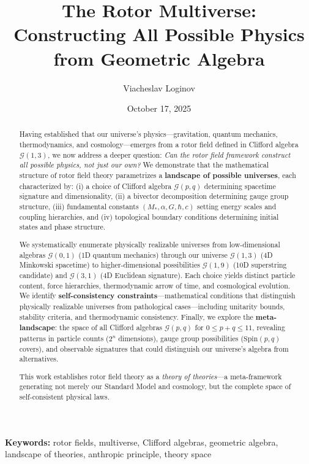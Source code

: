 \documentclass[11pt,a4paper]{article}
\title{\textbf{The Rotor Multiverse:\\
Constructing All Possible Physics\\
from Geometric Algebra}}
\author[1]{Viacheslav Loginov}
\affil[1]{Kyiv, Ukraine\\ \texttt{barthez.slavik@gmail.com}}
\date{\small October 17, 2025}
\numberwithin{equation}{section}
\theoremstyle{plain}
\theoremstyle{definition}
\theoremstyle{remark}
\newcommand{\Cl}{\mathcal{G}}               %
\begin{document}
\maketitle

\begin{abstract}
\noindent
Having established that our universe's physics—gravitation, quantum mechanics, thermodynamics, and cosmology—emerges from a rotor field defined in Clifford algebra $\Cl(1,3)$, we now address a deeper question: \emph{Can the rotor field framework construct all possible physics, not just our own?} We demonstrate that the mathematical structure of rotor field theory parametrizes a \textbf{landscape of possible universes}, each characterized by:
(i) a choice of Clifford algebra $\Cl(p,q)$ determining spacetime signature and dimensionality,
(ii) a bivector decomposition determining gauge group structure,
(iii) fundamental constants $(M_*, \alpha, G, \hbar, c)$ setting energy scales and coupling hierarchies, and
(iv) topological boundary conditions determining initial states and phase structure.

We systematically enumerate physically realizable universes from low-dimensional algebras $\Cl(0,1)$ (1D quantum mechanics) through our universe $\Cl(1,3)$ (4D Minkowski spacetime) to higher-dimensional possibilities $\Cl(1,9)$ (10D superstring candidate) and $\Cl(3,1)$ (4D Euclidean signature). Each choice yields distinct particle content, force hierarchies, thermodynamic arrow of time, and cosmological evolution. We identify \textbf{self-consistency constraints}—mathematical conditions that distinguish physically realizable universes from pathological cases—including unitarity bounds, stability criteria, and thermodynamic consistency. Finally, we explore the \textbf{meta-landscape}: the space of all Clifford algebras $\Cl(p,q)$ for $0 \leq p+q \leq 11$, revealing patterns in particle counts ($2^n$ dimensions), gauge group possibilities ($\mathrm{Spin}(p,q)$ covers), and observable signatures that could distinguish our universe's algebra from alternatives.

This work establishes rotor field theory as a \emph{theory of theories}—a meta-framework generating not merely our Standard Model and cosmology, but the complete space of self-consistent physical laws.
\end{abstract}

\noindent\textbf{Keywords:} rotor fields, multiverse, Clifford algebras, geometric algebra, landscape of theories, anthropic principle, theory space
\end{document}
